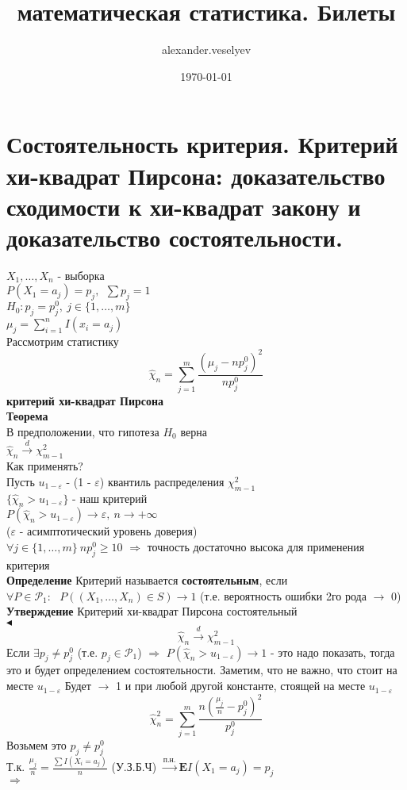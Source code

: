 \documentclass{article}
\title{математическая статистика. Билеты}
\author{alexander.veselyev }
\date{\today}
\begin{document}
\section{Состоятельность критерия. Критерий хи-квадрат Пирсона: доказательство сходимости к хи-квадрат закону и доказательство состоятельности.}
$X_1,\dots,X_n$ - выборка\\
$P(X_1 = a_j) = p_j,\ \ \sum{p_j} = 1$\\
$H_0: p_j = p_j^0,\ j\in\{1,\dots,m\}$\\
$\mu_j = \sum_{i=1}^n{I(x_i = a_j)}$\\
Рассмотрим статистику\\
$$\widehat{\chi}_n = \sum_{j = 1}^m{\frac{(\mu_j - np_j^0)^2}{np_j^0}}$$
\textbf{критерий хи-квадрат Пирсона}\\
\textbf{Теорема}\\
В предположении, что гипотеза $H_0$ верна\\
$\widehat{\chi}_n\xrightarrow{d}\chi^2_{m-1}$\\
Как применять?\\
Пусть $u_{1-\varepsilon}$ - (1 - $\varepsilon$) квантиль распределения $\chi^2_{m-1}$\\
$\{\widehat{\chi}_n > u_{1-\varepsilon}\}$ - наш критерий\\
$P(\widehat{\chi}_n > u_{1-\varepsilon})\rightarrow\varepsilon,\ n\rightarrow+\infty$\\
($\varepsilon$ - асимптотический уровень доверия)\\
$\forall j\in\{1,\dots,m\}\ np_j^0\geq 10$ $\Rightarrow$ точность достаточно высока для применения критерия\\
\textbf{Определение} Критерий называется \textbf{состоятельным}, если $\forall P\in \mathcal{P}_1:\ \ \ P((X_1,\dots,X_n)\in S)\rightarrow 1$ (т.е. вероятность ошибки 2го рода $\rightarrow$ 0)\\
\textbf{Утверждение} Критерий хи-квадрат Пирсона состоятельный\\
$\blacktriangleleft$\\
$$\widehat{\chi}_n\xrightarrow{d}\chi^2_{m-1}$$
Если $\exists p_j\neq p_j^0$ (т.е. $p_j\in\mathcal{P}_1$) $\Rightarrow$ $P(\widehat{\chi}_n > u_{1-\varepsilon})\rightarrow 1$ - это надо показать, тогда это и будет определением состоятельности. Заметим, что не важно, что стоит на месте $u_{1-\varepsilon}$ Будет $\rightarrow$ 1 и при любой другой константе, стоящей на месте $u_{1-\varepsilon}$\\

$$ \widehat{\chi}^2_n = \sum_{j=1}^m{\frac{n\left(\frac{\mu_j}{n} - p_j^0\right)^2}{p_j^0}} $$
Возьмем это $p_j\neq p_j^0$\\
Т.к. $\frac{\mu_j}{n} = \frac{\sum{I(X_i=a_j)}}{n}$ (У.З.Б.Ч) $\xrightarrow{\text{п.н.}} \mathbf{E}I(X_1 = a_j) = p_j$\\
$\Rightarrow$
\end{document}
